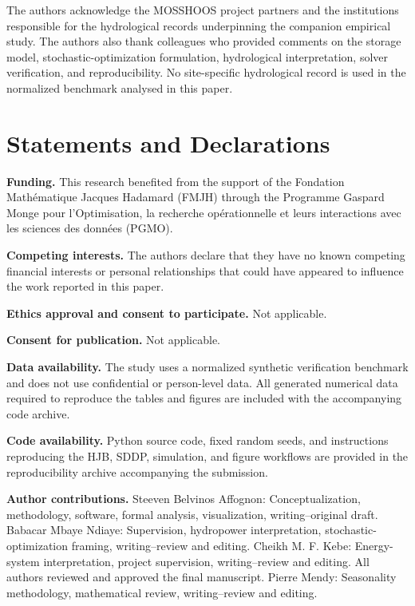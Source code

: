 \documentclass[pdflatex,sn-mathphys-num]{sn-jnl}
\theoremstyle{thmstyleone}
\theoremstyle{thmstyletwo}
\theoremstyle{thmstylethree}
\begin{document}
The authors acknowledge the MOSSHOOS project partners and the institutions
responsible for the hydrological records underpinning the companion empirical
study. The authors also thank colleagues who provided comments on the storage
model, stochastic-optimization formulation, hydrological interpretation,
solver verification, and reproducibility. No site-specific hydrological record
is used in the normalized benchmark analysed in this paper.

\section*{Statements and Declarations}

\textbf{Funding.} This research benefited from the support of the Fondation
Math\'ematique Jacques Hadamard (FMJH) through the Programme Gaspard Monge
pour l'Optimisation, la recherche op\'erationnelle et leurs interactions avec
les sciences des donn\'ees (PGMO).

\textbf{Competing interests.} The authors declare that they have no known
competing financial interests or personal relationships that could have
appeared to influence the work reported in this paper.

\textbf{Ethics approval and consent to participate.} Not applicable.

\textbf{Consent for publication.} Not applicable.

\textbf{Data availability.} The study uses a normalized synthetic
verification benchmark and does not use confidential or person-level
data. All generated numerical data required to reproduce the tables and
figures are included with the accompanying code archive.

\textbf{Code availability.} Python source code, fixed random seeds, and
instructions reproducing the HJB, SDDP, simulation, and figure workflows
are provided in the reproducibility archive accompanying the submission.

\textbf{Author contributions.} Steeven Belvinos Affognon: Conceptualization,
methodology, software, formal analysis, visualization, writing--original
draft. Babacar Mbaye Ndiaye: Supervision, hydropower interpretation,
stochastic-optimization framing, writing--review and editing. 
Cheikh M. F. Kebe: Energy-system interpretation, project supervision,
writing--review and editing. All authors reviewed and approved the final
manuscript. Pierre Mendy: Seasonality methodology, mathematical review, writing--review and editing.
\end{document}
